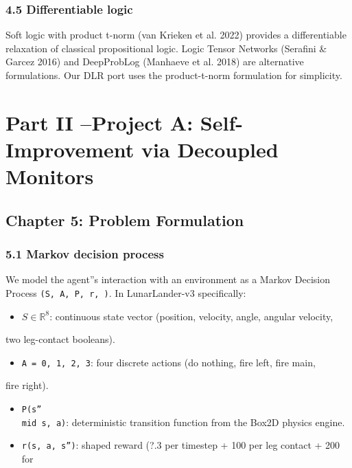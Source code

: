 \documentclass[11pt]{article}
\begin{document}
\subsubsection{4.5 Differentiable logic}

Soft logic with product t-norm (van Krieken et al. 2022) provides a differentiable
relaxation of classical propositional logic. Logic Tensor Networks (Serafini \&
Garcez 2016) and DeepProbLog (Manhaeve et al. 2018) are alternative formulations.
Our DLR port uses the product-t-norm formulation for simplicity.

\hrulefill

\section{Part II --Project A: Self-Improvement via Decoupled Monitors}

\subsection{Chapter 5: Problem Formulation}

\subsubsection{5.1 Markov decision process}

We model the agent''s interaction with an environment as a Markov Decision Process
\texttt{(S, A, P, r, )}. In LunarLander-v3 specifically:

\begin{itemize}
  \item $S \in \mathbb{R}^{8}$: continuous state vector (position, velocity, angle, angular velocity,
\end{itemize}

  two leg-contact booleans).
\begin{itemize}
  \item \texttt{A = {0, 1, 2, 3}}: four discrete actions (do nothing, fire left, fire main,
\end{itemize}

  fire right).
\begin{itemize}
  \item \texttt{P(s''\\mid s, a)}: deterministic transition function from the Box2D physics engine.
  \item \texttt{r(s, a, s'')}: shaped reward (?.3 per timestep + 100 per leg contact + 200 for
\end{itemize}
\end{document}
